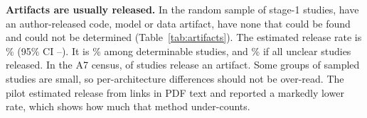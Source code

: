 \begin{table}[t]
\centering
\caption{Release of author code, models or data, verified on the web: a simple random sample of included studies by architecture, and a census of A7 studies.}
\label{tab:artifacts}
\footnotesize
\setlength{\tabcolsep}{4pt}

\end{table}

\textbf{Artifacts are usually released.} In the random sample of  stage-1 studies,  have an author-released code, model or data artifact,  have none that could be found and  could not be determined (Table~\ref{tab:artifacts}). The estimated release rate is \% (95\% CI --). It is \% among determinable studies, and \% if all unclear studies released. In the A7 census,  of  studies release an artifact. Some groups of sampled studies are small, so per-architecture differences should not be over-read. The pilot estimated release from links in PDF text and reported a markedly lower rate, which shows how much that method under-counts.
